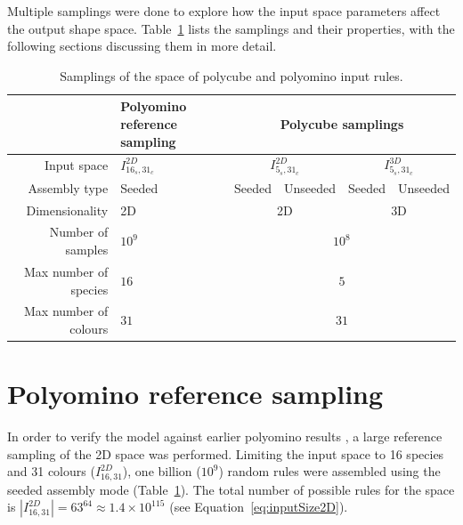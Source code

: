 Multiple samplings were done to explore how the input space parameters affect the output shape space. Table~\ref{tab:polycubeSamplings} lists the samplings and their properties, with the following sections discussing them in more detail.




\begin{table}[h!]
    \centering
    \begin{tabular}{|r||p{2cm}|c|c|c|c|}
        \hline
                                & Polyomino reference sampling & \multicolumn{4}{|c|}{Polycube samplings} \\ \hline\hline
        Input space             & \(I_{16_s,31_c}^{2D}\) & \multicolumn{2}{|c|}{\(I_{5_s,31_c}^{2D}\)} & \multicolumn{2}{|c|}{\(I_{5_s,31_c}^{3D}\)} \\ \hline
        Assembly type           & Seeded & Seeded & Unseeded & Seeded & Unseeded \\ \hline
        Dimensionality          & 2D & \multicolumn{2}{|c|}{2D} & \multicolumn{2}{|c|}{3D} \\ \hline
        Number of samples       & \(10^9\) & \multicolumn{4}{|c|}{\(10^8\)} \\ \hline
        Max number of species   & \(16\) & \multicolumn{4}{|c|}{\(5\)} \\ \hline
        Max number of colours   & \(31\) & \multicolumn{4}{|c|}{\(31\)}\\ \hline
    \end{tabular}
    \caption{Samplings of the space of polycube and polyomino input rules.}
    \label{tab:polycubeSamplings}
\end{table}

\section{Polyomino reference sampling}
\label{sec:refcalc}
In order to verify the model against earlier polyomino results \cite{johnston2021}, a large reference sampling of the 2D space was performed. Limiting the input space to 16 species and 31 colours (\(I_{16,31}^{2D}\)), one billion (\(10^9\)) random rules were assembled using the seeded assembly mode (Table~\ref{tab:polycubeSamplings}). 
The total number of possible rules for the space is \(\left\lvert I_{16,31}^{2D}\right\rvert = 63^{64} \approx 1.4 \times 10^{115}\) (see Equation~\ref{eq:inputSize2D}).

